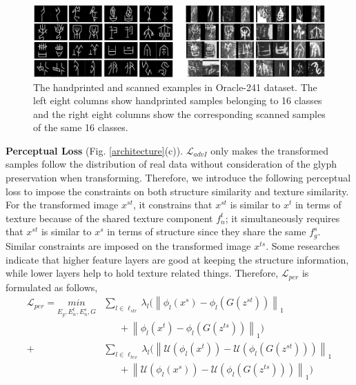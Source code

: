 \documentclass[10pt,journal,compsoc,twocolumn ]{IEEEtran}
\begin{document}
\begin{figure}[h]
\centering
\includegraphics[width=18cm]{oracle_example.pdf}
\caption{The handprinted and scanned examples in Oracle-241 dataset. The left eight columns show handprinted samples belonging to 16 classes and the right eight columns show the corresponding scanned samples of the same 16 classes.}
\label{oracle_example} %
\end{figure}

\textbf{Perceptual Loss} (Fig. \ref{architecture}(c)). $\mathcal{L}_{advI}$ only makes the transformed samples follow the distribution of real data without consideration of the glyph preservation when transforming. Therefore, we introduce the following perceptual loss to impose the constraints on both structure similarity and texture similarity. For the transformed image $x^{st}$, it constrains that $x^{st}$ is similar to $x^t$ in terms of texture because of the shared texture component $f^t_n$; it simultaneously requires that $x^{st}$ is similar to $x^s$ in terms of structure since they share the same $f^s_g$. Similar constraints are imposed on the transformed image $x^{ts}$. %
Some researches \cite{johnson2016perceptual,gatys2016neural} indicate that higher feature layers are good at keeping the structure information, while lower layers help to hold texture related things. Therefore, $\mathcal{L}_{per}$ is formulated as follows,
\begin{equation}
\begin{split}
\mathcal{L}_{per} = \underset{E_g,E^t_n,E^s_n,G}{min} &  \sum_{l\in \ell_{str}} \lambda_l (\left \| \phi_l\left ( x^s \right )- \phi_l\left ( G\left ( z^{st} \right ) \right )\right \|_1 \\
&  \ \ \ \ \ \ \ +\left \| \phi_l\left ( x^t \right )- \phi_l\left ( G\left ( z^{ts} \right ) \right )\right \|_1 ) \\
 + &\sum_{l\in \ell_{tex}}\lambda_l(  \left \| \mathcal{U}\left ( \phi_l\left ( x^t \right ) \right )- \mathcal{U}\left ( \phi_l\left ( G\left ( z^{st} \right ) \right ) \right )\right \|_1 \\
& \ \ \ \ \ \ \ + \left \| \mathcal{U}\left ( \phi_l\left ( x^s \right ) \right )- \mathcal{U}\left ( \phi_l\left ( G\left ( z^{ts} \right ) \right ) \right )\right \|_1) \label{per}
\end{split}
\end{equation}
\end{document}
